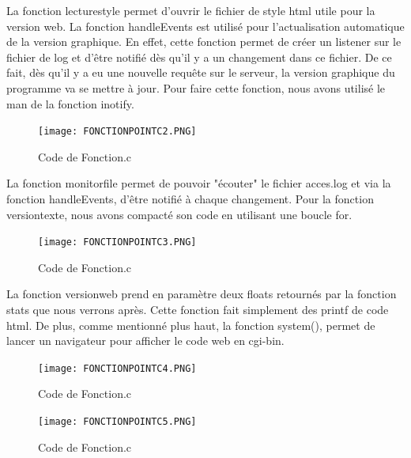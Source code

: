 \newpage

La fonction lecturestyle permet d'ouvrir le fichier de style html utile pour la version web. La fonction handleEvents est utilisé pour l'actualisation automatique de la version graphique. En effet, cette fonction permet de créer un listener sur le fichier de log et d'être notifié dès qu'il y a un changement dans ce fichier. De ce fait, dès qu'il y a eu une nouvelle requête sur le serveur, la version graphique du programme va se mettre à jour. Pour faire cette fonction, nous avons utilisé le man de la fonction inotify.

\begin{figure}[htp!]
  \centering
  \setlength\figureheight{7cm}
  \setlength\figurewidth{9cm}
  \texttt{[image: FONCTIONPOINTC2.PNG]}
  \caption{Code de Fonction.c}
  \label{fig:courbe-tikz}
\end{figure}

\newpage

La fonction monitorfile permet de pouvoir "écouter" le fichier acces.log et via la fonction handleEvents, d'être notifié à chaque changement. Pour la fonction versiontexte, nous avons compacté son code en utilisant une boucle for.

\begin{figure}[htp!]
  \centering
  \setlength\figureheight{7cm}  
  \setlength\figurewidth{9cm}
  \texttt{[image: FONCTIONPOINTC3.PNG]}
  \caption{Code de Fonction.c}
  \label{fig:courbe-tikz}
\end{figure}

\newpage

La fonction versionweb prend en paramètre deux floats retournés par la fonction stats que nous verrons après. Cette fonction fait simplement des printf de code html. De plus, comme mentionné plus haut, la fonction system(), permet de lancer un navigateur pour afficher le code web en cgi-bin.

\begin{figure}[htp!]
  \centering
  \setlength\figureheight{7cm}
  \setlength\figurewidth{9cm}
  \texttt{[image: FONCTIONPOINTC4.PNG]}
  \caption{Code de Fonction.c}
  \label{fig:courbe-tikz}
\end{figure}

\newpage

\begin{figure}[htp!]
  \centering
  \setlength\figureheight{7cm}
  \setlength\figurewidth{9cm}
  \texttt{[image: FONCTIONPOINTC5.PNG]}
  \caption{Code de Fonction.c}
  \label{fig:courbe-tikz}
\end{figure}


